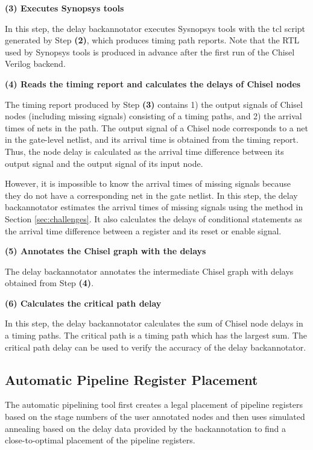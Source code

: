 {\bf (3) Executes Synopsys tools}

In this step, the delay backannotator executes Sysnopsys tools with the tcl script generated by Step {\bf (2)}, which produces timing path reports. Note that the RTL used by Synopsys tools is produced in advance after the first run of the Chisel Verilog backend.

{\bf (4) Reads the timing report and calculates the delays of Chisel nodes}

The timing report produced by Step {\bf (3)} contains 1) the output signals of Chisel nodes (including missing signals) consisting of a timing paths, and 2) the arrival times of nets in the path. The output signal of a Chisel node corresponds to a net in the gate-level netlist, and its arrival time is obtained from the timing report. Thus, the node delay is calculated as the arrival time difference between its output signal and the output signal of its input node.

However, it is impossible to know the arrival times of missing signals because they do not have a corresponding net in the gate netlist. In this step, the delay backannotator estimates the arrival times of missing signals using the method in Section \ref{sec:challenges}. It also calculates the delays of conditional statements as the arrival time difference between a register and its reset or enable signal.

{\bf (5) Annotates the Chisel graph with the delays}

The delay backannotator annotates the intermediate Chisel graph with delays obtained from Step {\bf (4)}.

{\bf (6) Calculates the critical path delay}

In this step, the delay backannotator calculates the sum of Chisel node delays in a timing paths. The critical path is a timing path which has the largest sum. The critical path delay can be used to verify the accuracy of the delay backannotator.

\subsection{Automatic Pipeline Register Placement}
The automatic pipelining tool first creates a legal placement of pipeline registers based on the stage numbers of the user annotated nodes and then uses simulated annealing based on the delay data provided by the backannotation to find a close-to-optimal placement of the pipeline registers. 

